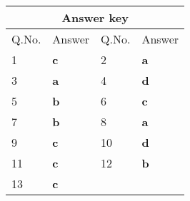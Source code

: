 \setlength\arrayrulewidth{1pt}
\begin{table}[H]
	\centering
	
	\begin{tabular}{|p{1.5cm}|p{1.5cm}||p{1.5cm}|p{1.5cm}|}
		\hline
		\multicolumn{4}{|c|}{\textbf{Answer key}}\\\hline\hline
		\rowcolor{ocrel}Q.No.&Answer&Q.No.&Answer\\\hline
		1&\textbf{c}&2&\textbf{a}\\\hline
		3&\textbf{a}&4&\textbf{d}\\\hline
		5&\textbf{b}&6&\textbf{c}\\\hline
		7&\textbf{b}&8&\textbf{a}\\\hline
		9&\textbf{c}&10&\textbf{d}\\\hline
		11&\textbf{c}&12&\textbf{b}\\\hline
		13&\textbf{c}&&\\\hline
	\end{tabular}
\end{table}

